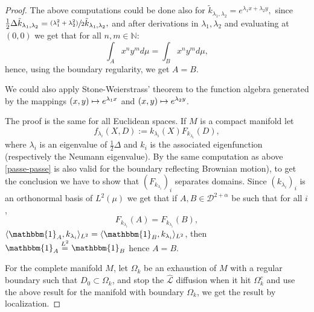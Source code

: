 \documentclass[10pt]{amsart}
\newcommand\mto{\mathchoice{\longmapsto}{\mapsto}{\mapsto}{\mapsto}}
\newcommand{\psfrac}[2]{\sfrac{(#1)}{#2}}
\theoremstyle{plain}
\theoremstyle{definition}
\newcommand{\SL}{{\mathscr L}}
\newcommand{\un}{\mathbbm{1}}
\let\a\alpha
\let\D\Delta
\newcommand{\cD}{\mathcal{D}}
\begin{document}
\begin{proof}
The above computations could be done also for $\tilde{k}_{\lambda_1,\lambda_2} = e^{\lambda_1 x + \lambda_2 y},$ since $\frac12 \D \tilde{k}_{\lambda_1,\lambda_2} = \psfrac{\lambda_1^2 + \lambda_2^2}{2} \tilde{k}_{\lambda_1,\lambda_2}, $ and after derivations in $\lambda_1,\lambda_2 $ and evaluating at $(0,0)$ we get that for all $n,m \in \mathbb{N}$:
\[
\int_A x^ny^m d\mu = \int_B x^ny^m d\mu,
\]
hence, using the boundary regularity, we get $A= B$.\par
{We could also apply Stone-Weierstrass' theorem to the function algebra generated by the mappings $(x,y)\mto e^{\lambda_1 x}$ and $(x,y)\mto e^{\lambda_2 y} $}.\par
The proof is the same for all Euclidean spaces.
If $M$ is a compact manifold
let
\[
f_{\lambda_i} (X,D):= k_{\lambda_i}(X) F_{k_{\lambda_i}}(D),
\]
where
$\lambda_i $ is an
eigenvalue of $\frac12 \D $ and $k_i$ is the associated eigenfunction (respectively the Neumann eigenvalue).
By the same computation as above \eqref{passe-passe} is also valid for the boundary reflecting Brownian motion), to get the conclusion we have to show that $ (F_{k_{\lambda_i}})_i $ separates domains.
Since $(k_{\lambda_i})_i$ is an orthonormal basis of $ L^2(\mu) $
we get that if $ A,B \in \cD^{2+\a}$ be such that for all $i$,
\[
F_{k_{\lambda_i}}(A) = F_{k_{\lambda_i}}(B),
\]
\ie $\langle \un_A,k_{\lambda_i} \rangle_{L^2} = \langle \un_B,k_{\lambda_i} \rangle_{L^2} $, then $\un_A \overset{L^2}= \un_B $
hence $A=B$.

For the complete manifold $M$, let $ \Omega_k$ be an exhaustion of $M$ with a regular boundary such that $ D_0 \subset \Omega_k$, and stop the $\widehat{\SL} $ diffusion when it hit $\Omega_k^c$ and use the above result for the manifold with boundary $\Omega_k $, we get the result by localization.
\end{proof}
\end{document}
